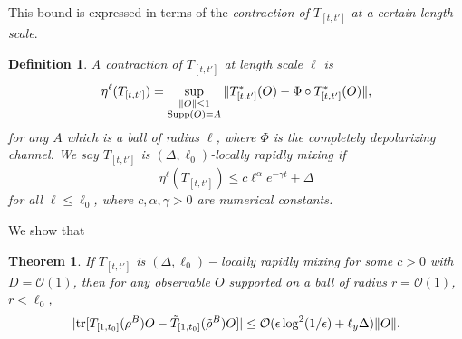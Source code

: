 \documentclass[prx,aps,amsmath,amssymb,floatfix,superscriptaddress,11pt,tightenlines,longbibliography,onecolumn,notitlepage]{revtex4-1}
\newcommand{\Tr}{\textnormal{tr}}
\newcommand{\Supp}[1]{\textnormal{Supp}(#1)}
\newtheorem{thm}{Theorem}
\newtheorem{defi}{Definition}
\begin{document}
This bound is expressed in terms of the \emph{contraction of $T_{[t,t']}$ at a certain length scale}.
\begin{defi}
  A contraction of $T_{[t,t']}$ at length scale $\ell$ is
  \begin{equation}
    \eta^{\ell}(T_{[t,t']}) = \sup_{\substack{\| O \|\leq 1 \\ \Supp{O} =A}}\| T_{[t,t']}^*(O) - \Phi \circ T_{[t,t']}^*(O) \|,
  \end{equation}
for any $A$ which is a ball of radius $\ell$, where $\Phi$ is the completely depolarizing channel. We say $T_{[t,t']}$ is $(\Delta, \ell_0)$-locally rapidly mixing if 
  \begin{equation}
    \eta^{\ell}(T_{[t,t']}) \leq c\ell^{\alpha}e^{-\gamma t} + \Delta
  \end{equation}
  for all $\ell\leq \ell_0$, where $c,\alpha,\gamma>0$ are numerical constants.
\end{defi}
We show that
\begin{thm}
  \label{thm:local_rapid_mixing}
  If $T_{[t,t']}$ is  $(\Delta, \ell_0)-$locally rapidly mixing for some $c>0$ with $D=\mathcal{O}(1)$, then for any observable $O$ supported on a ball of radius $r=\mathcal{O}(1)$, $r<\ell_0$,
  \begin{equation}
    |\Tr[T_{[1,t_0]}(\rho^B) O - \tilde{T}_{[1,t_0]}(\tilde{\rho}^B)O]| \leq \mathcal{O}(\epsilon \log^2(1/\epsilon) + \ell_y\Delta)\|O \|.
    \end{equation}
  \end{thm}
\end{document}

